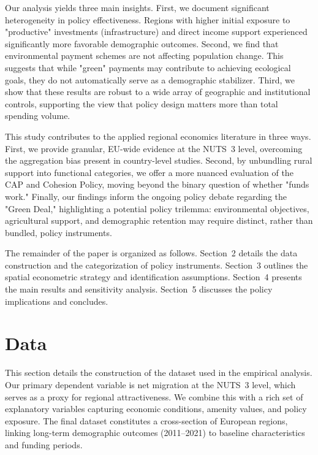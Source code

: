 \documentclass[
	a4paper, %
	10pt, %
]{LTJournalArticle}
\begin{document}
Our analysis yields three main insights. First, we document significant heterogeneity in policy effectiveness. Regions with higher initial exposure to "productive" investments (infrastructure) and direct income support experienced significantly more favorable demographic outcomes. Second, we find that environmental payment schemes are not affecting population change. This suggests that while "green" payments may contribute to achieving ecological goals, they do not automatically serve as a demographic stabilizer. Third, we show that these results are robust to a wide array of geographic and institutional controls, supporting the view that policy design matters more than total spending volume.

This study contributes to the applied regional economics literature in three ways. First, we provide granular, EU-wide evidence at the NUTS~3 level, overcoming the aggregation bias present in country-level studies. Second, by unbundling rural support into functional categories, we offer a more nuanced evaluation of the CAP and Cohesion Policy, moving beyond the binary question of whether "funds work." Finally, our findings inform the ongoing policy debate regarding the "Green Deal," highlighting a potential policy trilemma: environmental objectives, agricultural support, and demographic retention may require distinct, rather than bundled, policy instruments.

The remainder of the paper is organized as follows. Section~2 details the data construction and the categorization of policy instruments. Section~3 outlines the spatial econometric strategy and identification assumptions. Section~4 presents the main results and sensitivity analysis. Section~5 discusses the policy implications and concludes.


\section{Data}
This section details the construction of the dataset used in the empirical analysis. Our primary dependent variable is net migration at the NUTS~3 level, which serves as a proxy for regional attractiveness. We combine this with a rich set of explanatory variables capturing economic conditions, amenity values, and policy exposure. The final dataset constitutes a cross-section of European regions, linking long-term demographic outcomes (2011–2021) to baseline characteristics and funding periods.
\end{document}
